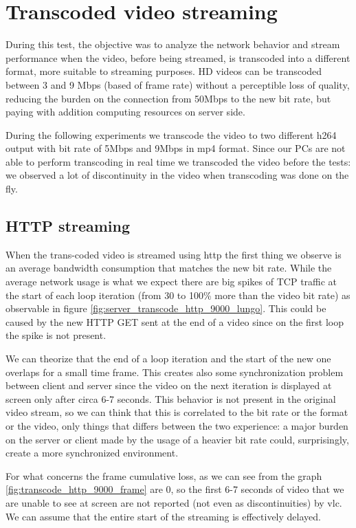 \documentclass{exam}
\begin{document}
\section{Transcoded video streaming}
During this test, the objective was to analyze the network behavior and stream performance when the video, before being streamed, is transcoded into a different format, more suitable to streaming purposes. HD videos can be transcoded between 3 and 9 Mbps (based of frame rate) without a perceptible loss of quality, reducing the burden on the connection from 50Mbps to the new bit rate, but paying with addition computing resources on server side.

During the following experiments we transcode the video to two different h264 output with bit rate of 5Mbps and 9Mbps in mp4 format. Since our PCs are not able to perform transcoding in real time we transcoded the video before the tests: we observed a lot of discontinuity in the video when transcoding was done on the fly. 

\subsection{HTTP streaming}
When the trans-coded video is streamed using http the first thing we observe is an average bandwidth consumption that matches the new bit rate. While the average network usage is what we expect there are big spikes of TCP traffic at the start of each loop iteration (from 30 to 100\% more than the video bit rate) as observable in figure \ref{fig:server_transcode_http_9000_lungo}. This could be caused by the new HTTP GET sent at the end of a video since on the first loop the spike is not present. 

We can theorize that the end of a loop iteration and the start of the new one overlaps for a small time frame. This creates also some synchronization problem between client and server since the video on the next iteration is displayed at screen only after circa 6-7 seconds. This behavior is not present in the original video stream, so we can think that this is correlated to the bit rate or the format or the video, only things that differs between the two experience: a major burden on the server or client made by the usage of a heavier bit rate could, surprisingly, create a more synchronized environment.


For what concerns the frame cumulative loss, as we can see from the graph \ref{fig:transcode_http_9000_frame} are 0, so the first 6-7 seconds of video that we are unable to see at screen are not reported (not even as discontinuities) by vlc. We can assume that the entire start of the streaming is effectively delayed.
\end{document}

